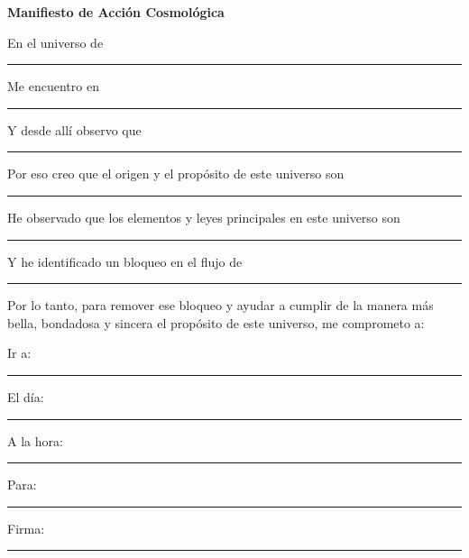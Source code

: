 \documentclass[statementpaper,oneside,article,10pt]{memoir}
\begin{document}
\begin{center}
\textbf{Manifiesto de Acción Cosmológica}
\end{center}

En el universo de \\
\rule{\textwidth}{0.1pt}

Me encuentro en \\
\rule{\textwidth}{0.1pt}

Y desde allí observo que \\
\rule{\textwidth}{0.1pt}

Por eso creo que el origen y el propósito de este universo son \\
\rule{\textwidth}{0.1pt}

He observado que los elementos y leyes principales en este universo son \\
\rule{\textwidth}{0.1pt}

Y he identificado un bloqueo en el flujo de\\
\rule{\textwidth}{0.1pt}

\vspace{1cm}
Por lo tanto, para remover ese bloqueo y ayudar a cumplir de la manera más bella, bondadosa y sincera el propósito de este universo, me comprometo a:

\vspace{0.5cm}
Ir a: \rule{8cm}{0.1pt}

El día: \rule{8cm}{0.1pt}

A la hora: \rule{8cm}{0.1pt}

Para: \rule{8cm}{0.1pt}

\vspace{0.1cm}
Firma: \rule{8cm}{0.1pt}
\end{document}
